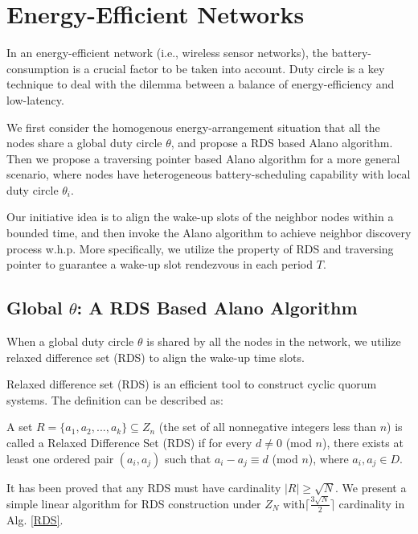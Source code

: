 \section{Energy-Efficient Networks}
\label{EEN}
In an energy-efficient network (i.e., wireless sensor networks), 
the battery-consumption is a crucial factor to be taken into account.
Duty circle is a key technique to deal with the dilemma between a 
balance of energy-efficiency and low-latency.


We first consider the homogenous energy-arrangement situation
that  all the nodes share a global duty circle $\theta$, and propose
a RDS based Alano algorithm. Then we propose a traversing pointer 
based Alano algorithm for a more general scenario, 
where nodes have heterogeneous battery-scheduling 
capability with local duty circle $\theta_i$.

Our initiative idea is to align the wake-up slots of the neighbor nodes within a bounded time,
and then invoke the Alano algorithm to achieve neighbor discovery process w.h.p. 
More specifically, we utilize the property of RDS and traversing pointer to guarantee 
a wake-up slot rendezvous in each period $T$. 

\subsection{Global $\theta$: A RDS Based Alano Algorithm}

When a global duty circle $\theta$ is shared by all the nodes in the network,
we utilize relaxed difference set (RDS) to align the wake-up time slots.


Relaxed difference set (RDS) is an efficient tool to 
construct cyclic quorum systems\cite{jiang2005quorum,luk1997two}. The definition can be
described as:
\begin{definition}
A set $R=\{a_1,a_2,...,a_k\} \subseteq Z_n$ (the set of all nonnegative integers less than $n$) 
is called a Relaxed Difference Set (RDS) if for every $d \neq 0$ (mod $n$), 
there exists at least one ordered pair $(a_i,a_j)$ such that $a_i - a_j \equiv d$ (mod $n$), where $a_i,a_j \in D$.
\end{definition}

It has been proved that 
any RDS must have cardinality $|R| \geq \sqrt{N}$\cite{luk1997two}.
We present a simple linear algorithm for RDS construction under $Z_N$
with$\lceil \frac{3\sqrt{N}}{2}  \rceil$ cardinality in Alg. \ref{RDS}. 

